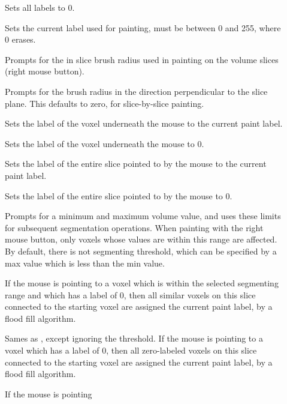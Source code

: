 \begin{description}
\item[]  Sets all labels to 0.
\item[]  Sets the current label
    used for painting, must be between 0 and 255, where 0 erases.
\item[]  Prompts for the in slice 
    brush radius used in painting on the volume slices (right mouse button).
\item[]  Prompts for the brush
    radius in the direction perpendicular to the slice plane.  This
    defaults to zero, for slice-by-slice painting.
\item[]  Sets the label of the voxel
    underneath the mouse to the current paint label.
\item[]  Sets the label of the voxel
    underneath the mouse to 0.
\item[]  Sets the label of the 
    entire slice pointed to by the mouse to the current paint label.
\item[]  Sets the label of the 
    entire slice pointed to by the mouse to 0.
\item[]  Prompts for a minimum and
    maximum volume value, and uses these limits for subsequent segmentation
    operations.  When painting with the right mouse button, only
    voxels whose values are within this range are affected.  By
    default, there is not segmenting threshold, which can be specified
    by a max value which is less than the min value.
\item[]  If the mouse is pointing
    to a voxel which is within the selected segmenting range and which
    has a label of 0, then all similar voxels on this slice connected
    to the starting voxel are assigned the current paint label, by a
    flood fill algorithm.
\item[]  Sames as
    , except ignoring the threshold.
    If the mouse is pointing to a voxel which has a label of 0, then all
    zero-labeled voxels on this slice connected
    to the starting voxel are assigned the current paint label, by a
    flood fill algorithm.
\item[]  If the mouse is pointing

\end{description}
